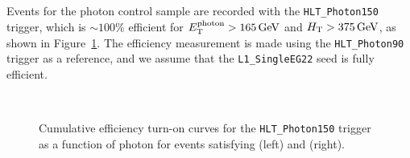 Events for the photon control sample are recorded with the
\verb!HLT_Photon150! trigger, which is $\sim100\%$ efficient for
$E_{\rm T}^{\rm photon} > 165\,\text{Ge\hspace{-.08em}V}$ and $\mbox{$H_\text{T}$} > 375\,\text{Ge\hspace{-.08em}V}$, as shown
in Figure~\ref{fig:eff-photon}. The efficiency measurement is made
using the \verb!HLT_Photon90! trigger as a reference, and we assume
that the \verb!L1_SingleEG22! seed is fully efficient.

\begin{figure}[!h]
  \begin{center}
  \\     
    \caption{\label{fig:eff-photon}
    Cumulative efficiency turn-on curves for the \texttt{HLT\_Photon150} trigger 
    as a function of photon \pt for events satisfying \njetlow 
    (left) and \njethigh (right).} 
  \end{center}
\end{figure}


